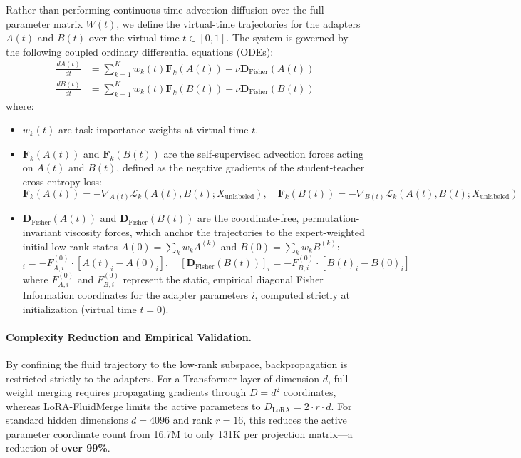 \documentclass{article}
\theoremstyle{plain}
\theoremstyle{definition}
\theoremstyle{remark}
\begin{document}
Rather than performing continuous-time advection-diffusion over the full parameter matrix $W(t)$, we define the virtual-time trajectories for the adapters $A(t)$ and $B(t)$ over the virtual time $t \in [0, 1]$. The system is governed by the following coupled ordinary differential equations (ODEs):
\begin{align}
\frac{dA(t)}{dt} &= \sum_{k=1}^K w_k(t) \mathbf{F}_k(A(t)) + \nu \mathbf{D}_{\text{Fisher}}(A(t)) \\
\frac{dB(t)}{dt} &= \sum_{k=1}^K w_k(t) \mathbf{F}_k(B(t)) + \nu \mathbf{D}_{\text{Fisher}}(B(t))
\end{align}
where:
\begin{itemize}
    \item $w_k(t)$ are task importance weights at virtual time $t$.
    \item $\mathbf{F}_k(A(t))$ and $\mathbf{F}_k(B(t))$ are the self-supervised advection forces acting on $A(t)$ and $B(t)$, defined as the negative gradients of the student-teacher cross-entropy loss:
          \begin{equation}
          \mathbf{F}_k(A(t)) = -\nabla_{A(t)} \mathcal{L}_k\left(A(t), B(t); X_{\text{unlabeled}}\right), \quad \mathbf{F}_k(B(t)) = -\nabla_{B(t)} \mathcal{L}_k\left(A(t), B(t); X_{\text{unlabeled}}\right)
          \end{equation}
    \item $\mathbf{D}_{\text{Fisher}}(A(t))$ and $\mathbf{D}_{\text{Fisher}}(B(t))$ are the coordinate-free, permutation-invariant viscosity forces, which anchor the trajectories to the expert-weighted initial low-rank states $A(0) = \sum_k w_k A^{(k)}$ and $B(0) = \sum_k w_k B^{(k)}$:
          \begin{equation}
          [\mathbf{D}_{\text{Fisher}}(A(t))]_i = - F_{A, i}^{(0)} \cdot \left[ A(t)_i - A(0)_i \right], \quad [\mathbf{D}_{\text{Fisher}}(B(t))]_i = - F_{B, i}^{(0)} \cdot \left[ B(t)_i - B(0)_i \right]
          \end{equation}
          where $F_{A, i}^{(0)}$ and $F_{B, i}^{(0)}$ represent the static, empirical diagonal Fisher Information coordinates for the adapter parameters $i$, computed strictly at initialization (virtual time $t=0$).
\end{itemize}

\paragraph{Complexity Reduction and Empirical Validation.} By confining the fluid trajectory to the low-rank subspace, backpropagation is restricted strictly to the adapters. For a Transformer layer of dimension $d$, full weight merging requires propagating gradients through $D = d^2$ coordinates, whereas LoRA-FluidMerge limits the active parameters to $D_{\text{LoRA}} = 2 \cdot r \cdot d$. For standard hidden dimensions $d = 4096$ and rank $r = 16$, this reduces the active parameter coordinate count from 16.7M to only 131K per projection matrix---a reduction of \textbf{over 99\%}.
\end{document}
